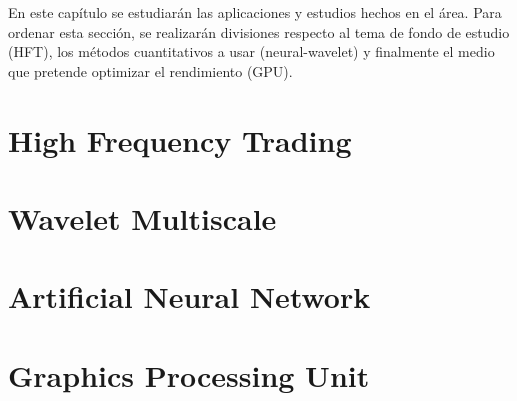 En este capítulo se estudiarán las aplicaciones y estudios hechos en el área. Para ordenar esta sección, se
realizarán divisiones respecto al tema de fondo de estudio (HFT), los métodos cuantitativos a usar (neural-wavelet)
y finalmente el medio que pretende optimizar el rendimiento (GPU).

\section{High Frequency Trading}

\section{Wavelet Multiscale}

\section{Artificial Neural Network}

\section{Graphics Processing Unit}
